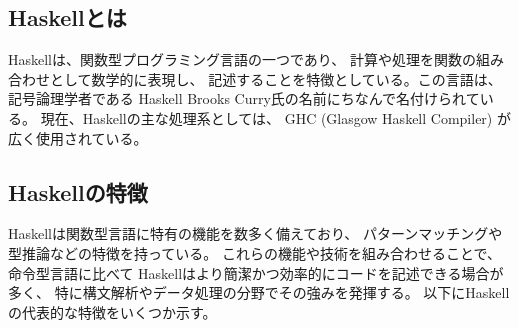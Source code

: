 \documentclass{cssspaper}
\begin{document}
            \subsection{Haskellとは}
            Haskellは、関数型プログラミング言語の一つであり、
            計算や処理を関数の組み合わせとして数学的に表現し、
            記述することを特徴としている。この言語は、記号論理学者である
            Haskell Brooks Curry氏の名前にちなんで名付けられている。
            現在、Haskellの主な処理系としては、
            GHC (Glasgow Haskell Compiler) が広く使用されている。
      
            \subsection{Haskellの特徴}
            Haskellは関数型言語に特有の機能を数多く備えており、
            パターンマッチングや型推論などの特徴を持っている。
            これらの機能や技術を組み合わせることで、命令型言語に比べて
            Haskellはより簡潔かつ効率的にコードを記述できる場合が多く、
            特に構文解析やデータ処理の分野でその強みを発揮する。
            以下にHaskellの代表的な特徴をいくつか示す。
\end{document}
